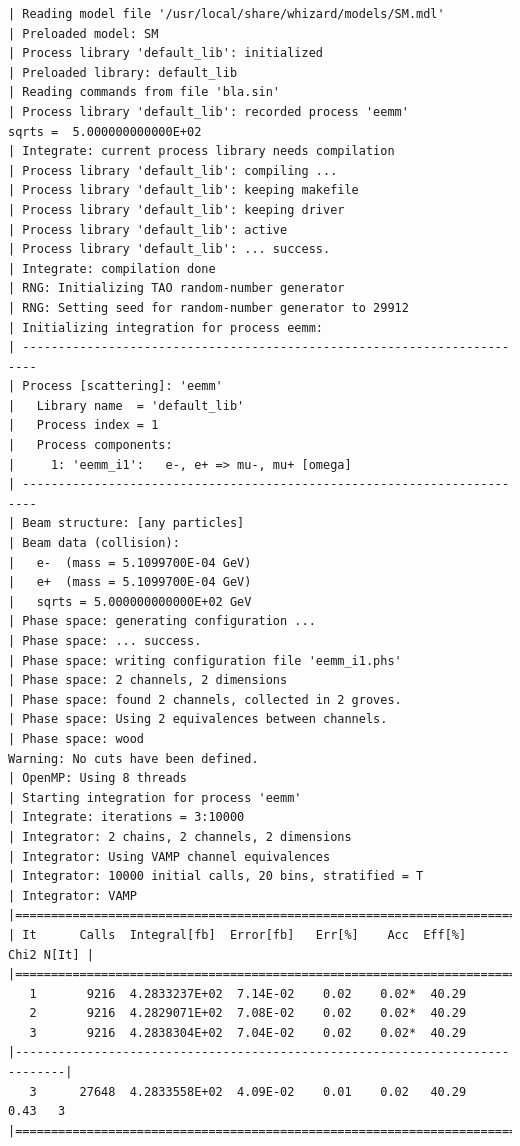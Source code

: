 \documentclass[12pt]{book}
\begin{document}
\begin{footnotesize}
\begin{verbatim}
| Reading model file '/usr/local/share/whizard/models/SM.mdl'
| Preloaded model: SM
| Process library 'default_lib': initialized
| Preloaded library: default_lib
| Reading commands from file 'bla.sin'
| Process library 'default_lib': recorded process 'eemm'
sqrts =  5.000000000000E+02
| Integrate: current process library needs compilation
| Process library 'default_lib': compiling ...
| Process library 'default_lib': keeping makefile
| Process library 'default_lib': keeping driver
| Process library 'default_lib': active
| Process library 'default_lib': ... success.
| Integrate: compilation done
| RNG: Initializing TAO random-number generator
| RNG: Setting seed for random-number generator to 29912
| Initializing integration for process eemm:
| ------------------------------------------------------------------------
| Process [scattering]: 'eemm'
|   Library name  = 'default_lib'
|   Process index = 1
|   Process components:
|     1: 'eemm_i1':   e-, e+ => mu-, mu+ [omega]
| ------------------------------------------------------------------------
| Beam structure: [any particles]
| Beam data (collision):
|   e-  (mass = 5.1099700E-04 GeV)
|   e+  (mass = 5.1099700E-04 GeV)
|   sqrts = 5.000000000000E+02 GeV
| Phase space: generating configuration ...
| Phase space: ... success.
| Phase space: writing configuration file 'eemm_i1.phs'
| Phase space: 2 channels, 2 dimensions
| Phase space: found 2 channels, collected in 2 groves.
| Phase space: Using 2 equivalences between channels.
| Phase space: wood
Warning: No cuts have been defined.
| OpenMP: Using 8 threads
| Starting integration for process 'eemm'
| Integrate: iterations = 3:10000
| Integrator: 2 chains, 2 channels, 2 dimensions
| Integrator: Using VAMP channel equivalences
| Integrator: 10000 initial calls, 20 bins, stratified = T
| Integrator: VAMP
|=============================================================================|
| It      Calls  Integral[fb]  Error[fb]   Err[%]    Acc  Eff[%]   Chi2 N[It] |
|=============================================================================|
   1       9216  4.2833237E+02  7.14E-02    0.02    0.02*  40.29
   2       9216  4.2829071E+02  7.08E-02    0.02    0.02*  40.29
   3       9216  4.2838304E+02  7.04E-02    0.02    0.02*  40.29
|-----------------------------------------------------------------------------|
   3      27648  4.2833558E+02  4.09E-02    0.01    0.02   40.29    0.43   3
|=============================================================================|

\end{verbatim}
\end{footnotesize}
\end{document}
